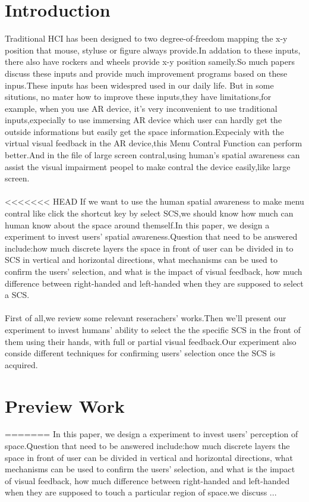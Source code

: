 \section{Introduction}
\label{intro}
Traditional HCI has been designed to two degree-of-freedom mapping the x-y position that mouse, styluse or figure always provide.In addation to these inputs, there also have rockers and wheels provide x-y position sameily.So much papers discuss these inputs and provide much improvement programs based on these inpus.These inputs has been widespred used in our daily life.
But in some situtions, no mater how to improve these inputs,they have limitations,for example, when you use AR device, it's very inconvenient to use traditional inputs,expecially to use immersing AR  device which user can hardly get the outside informations but easily get the space information.Expecialy with the virtual visual feedback in the AR device,this Menu Contral Function can perform better.And in the file of large screen contral,using human's spatial awareness can assist the visual impairment peopel to make contral the device easily,like large screen.
\\
\\
<<<<<<< HEAD
If we want to use the human spatial awareness to make menu contral like click the shortcut key by select SCS,we should know how much can human know about the space around themself.In this paper, we design a experiment to invest users' spatial awareness.Question that need to be answered include:how much discrete layers the space in front of user can be divided in to SCS in vertical and horizontal directions, what mechanisms can be used to confirm the users' selection, and what is the impact of visual feedback, how much difference between right-handed and left-handed when they are supposed to select a SCS.
\\
\\
First of all,we review some relevant reserachers' works.Then we'll present our experiment to invest humans' ability to select the the specific SCS in the front of them using their hands, with full or partial visual feedback.Our experiment also conside different techniques for confirming users' selection once the SCS is acquired.
\section{Preview Work}
=======
In this paper, we design a experiment to invest users' perception of space.Question that need to be answered include:how much discrete layers the space in front of user can be divided in vertical and horizontal directions, what mechanisms can be used to confirm the users' selection, and what is the impact of visual feedback, how much difference between right-handed and left-handed when they are supposed to touch a particular region of space.we discuss ...
